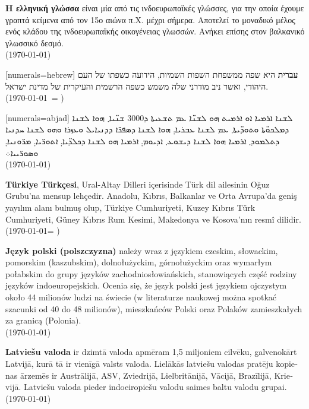 \documentclass[a4paper]{article}
\begin{document}
\begin{greek}
  \textbf{Η ελληνική γλώσσα} είναι μία από τις ινδοευρωπαϊκές γλώσσες, για την
  οποία έχουμε γραπτά κείμενα από τον 15ο αιώνα π.Χ. μέχρι σήμερα. Αποτελεί το
  μοναδικό μέλος ενός κλάδου της ινδοευρωπαϊκής οικογένειας γλωσσών. Ανήκει
  επίσης στον βαλκανικό γλωσσικό δεσμό.\\
  (\today)
\end{greek}


\begin{hebrew}[numerals=hebrew]
  \textbf{עברית} היא שפה ממשפחת השפות השמיות, הידועה כשפתו של העם היהודי, ואשר ניב מודרני שלה משמש כשפה הרשמית והעיקרית של מדינת ישראל. \\
  (\today\ = \hebrewtoday)
\end{hebrew}

\begin{syriac}[numerals=abjad]
  ܠܫܢܐ ܐܪܡܝܐ ܐܘ ܐܪܡܝܬ ܗܘ ܠܫܢ̈ܐ ܥܡ ܬܫܥܝܬܐ ܕ\textrm{3000} ܫܢ̈ܝܐ܂ ܗܘܐ ܠܫܢܐ ܕܡܠܟܘ̈ܬܐ ܘܬܘܕ̈ܝܬܐ܂ ܥܡ ܠܫܢܐ ܥܒܪܝܐ܄ ܗܘܐ ܠܫܢܐ ܕܣܦܪ̈ܐ ܕܕܢܝܐܝܠ ܘܥܙܪܐ ܘܗܘ ܠܫܢܐ ܚܕܢܝܐ ܕܬܠܡܘܕ܂ ܐܪܡܝܐ ܗܘܐ ܠܫܢܐ ܕܝܫܘܥ܂ ܐܕܝܘܡ܄ ܐܪܡܝܐ ܗܘ ܠܫܢܐ ܕܟܠܕ̈ܝܐ܄ ܐܬܘܪ̈ܝܐ܄ ܡܪ̈ܘܢܝܐ܄ ܘܣܘܪ̈ܝܝܐ܀ \\
  (\today)
\end{syriac}

\begin{turkish}
  \textbf{Türkiye Türkçesi}, Ural-Altay Dilleri içerisinde Türk dil ailesinin Oğuz Grubu'na mensup lehçedir. Anadolu, Kıbrıs, Balkanlar ve Orta Avrupa'da geniş yayılım alanı bulmuş olup, Türkiye Cumhuriyeti, Kuzey Kıbrıs Türk Cumhuriyeti, Güney Kıbrıs Rum Kesimi, Makedonya ve Kosova'nın resmî dilidir. \\
  (\today = \Hijritoday)
\end{turkish}

\begin{polish}
  \textbf{Język polski (polszczyzna)} należy wraz z językiem czeskim, słowackim, pomorskim (kaszubskim), dolnołużyckim, górnołużyckim oraz wymarłym połabskim do grupy języków zachodniosłowiańskich, stanowiących część rodziny języków indoeuropejskich. Ocenia się, że język polski jest językiem ojczystym około 44 milionów ludzi na świecie (w literaturze naukowej można spotkać szacunki od 40 do 48 milionów), mieszkańców Polski oraz Polaków zamieszkałych za granicą (Polonia).\\
  (\today)
\end{polish}

\begin{latvian}
  \textbf{Latviešu valoda} ir dzimtā valoda apmēram 1,5 miljoniem cilvēku, galvenokārt Latvijā, kurā tā ir vienīgā valsts valoda. Lielākās latviešu valodas pratēju kopienas ārzemēs ir Austrālijā, ASV, Zviedrijā, Lielbritānijā, Vācijā, Brazīlijā, Krievijā. Latviešu valoda pieder indoeiropiešu valodu saimes baltu valodu grupai.\\
  (\today)
\end{latvian}
\end{document}
